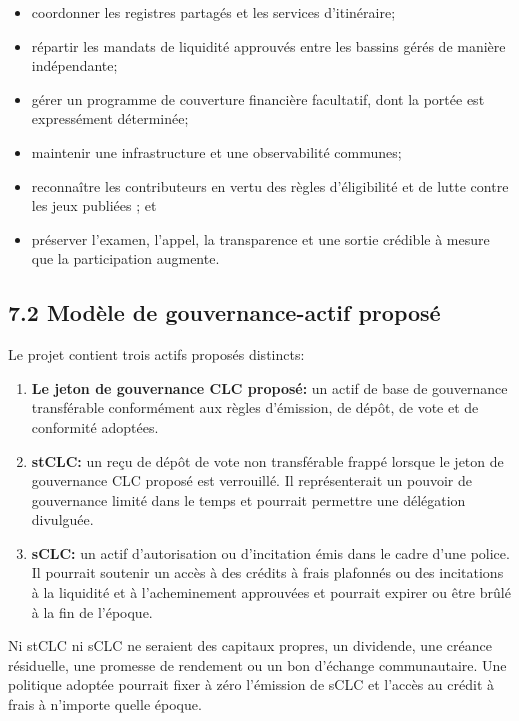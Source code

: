 \documentclass[11pt]{article}
\begin{document}
\begin{itemize}[leftmargin=*]
\item coordonner les registres partagés et les services d'itinéraire;
\item répartir les mandats de liquidité approuvés entre les bassins gérés de manière indépendante;
\item gérer un programme de couverture financière facultatif, dont la portée est expressément déterminée;
\item maintenir une infrastructure et une observabilité communes;
\item reconnaître les contributeurs en vertu des règles d'éligibilité et de lutte contre les jeux publiées ; et
\item préserver l'examen, l'appel, la transparence et une sortie crédible à mesure que la participation augmente.
\end{itemize}
\subsection*{7.2 Modèle de gouvernance-actif proposé}

Le projet contient trois actifs proposés distincts:

\begin{enumerate}[leftmargin=*]
\item \textbf{Le jeton de gouvernance CLC proposé:} un actif de base de gouvernance transférable conformément aux règles d'émission, de dépôt, de vote et de conformité adoptées.
\item \textbf{stCLC:} un reçu de dépôt de vote non transférable frappé lorsque le jeton de gouvernance CLC proposé est verrouillé. Il représenterait un pouvoir de gouvernance limité dans le temps et pourrait permettre une délégation divulguée.
\item \textbf{sCLC:} un actif d'autorisation ou d'incitation émis dans le cadre d'une police. Il pourrait soutenir un accès à des crédits à frais plafonnés ou des incitations à la liquidité et à l'acheminement approuvées et pourrait expirer ou être brûlé à la fin de l'époque.
\end{enumerate}
Ni stCLC ni sCLC ne seraient des capitaux propres, un dividende, une créance résiduelle, une promesse de rendement ou un bon d'échange communautaire. Une politique adoptée pourrait fixer à zéro l'émission de sCLC et l'accès au crédit à frais à n'importe quelle époque.
\end{document}
